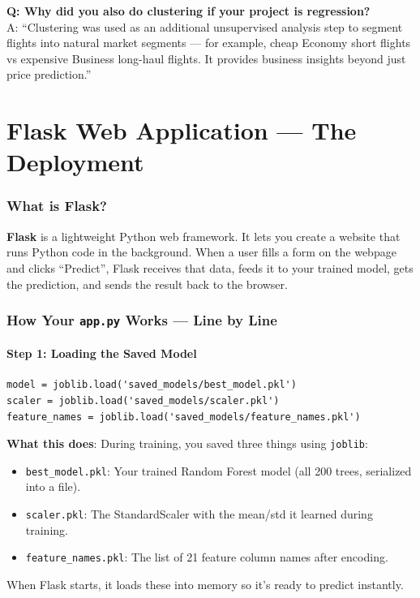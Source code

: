 \documentclass[12pt, a4paper]{article}
\begin{document}
\begin{warnbox}
    \textbf{Q: Why did you also do clustering if your project is regression?} \\
    A: ``Clustering was used as an additional unsupervised analysis step to segment flights into natural market segments — for example, cheap Economy short flights vs expensive Business long-haul flights. It provides business insights beyond just price prediction.''
\end{warnbox}



\part{Flask Web Application — The Deployment}

\section{What is Flask?}

\begin{conceptbox}
    \textbf{Flask} is a lightweight Python web framework. It lets you create a website that runs Python code in the background. When a user fills a form on the webpage and clicks ``Predict'', Flask receives that data, feeds it to your trained model, gets the prediction, and sends the result back to the browser.
\end{conceptbox}

\section{How Your \texttt{app.py} Works — Line by Line}

\subsection{Step 1: Loading the Saved Model}
\begin{lstlisting}
model = joblib.load('saved_models/best_model.pkl')
scaler = joblib.load('saved_models/scaler.pkl')
feature_names = joblib.load('saved_models/feature_names.pkl')
\end{lstlisting}

\textbf{What this does}: During training, you saved three things using \texttt{joblib}:
\begin{itemize}
    \item \texttt{best\_model.pkl}: Your trained Random Forest model (all 200 trees, serialized into a file).
    \item \texttt{scaler.pkl}: The StandardScaler with the mean/std it learned during training.
    \item \texttt{feature\_names.pkl}: The list of 21 feature column names after encoding.
\end{itemize}
When Flask starts, it loads these into memory so it's ready to predict instantly.
\end{document}
